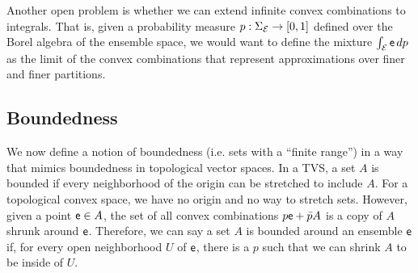 Another open problem is whether we can extend infinite convex combinations to integrals. That is, given a probability measure $p : \Sigma_{\mathcal{E}} \to [0,1]$ defined over the Borel algebra of the ensemble space, we would want to define the mixture $\int_{\mathcal{E}} \mathsf{e} \, dp$ as the limit of the convex combinations that represent approximations over finer and finer partitions. 

\subsection{Boundedness}

We now define a notion of boundedness (i.e. sets with a ``finite range'') in a way that mimics boundedness in topological vector spaces. In a TVS, a set $A$ is bounded if every neighborhood of the origin can be stretched to include $A$. For a topological convex space, we have no origin and no way to stretch sets. However, given a point $\mathsf{e} \in A$, the set of all convex combinations $p \mathsf{e} + \bar{p} A$ is a copy of $A$ shrunk around $\mathsf{e}$. Therefore, we can say a set $A$ is bounded around an ensemble $\mathsf{e}$ if, for every open neighborhood $U$ of $\mathsf{e}$, there is a $p$ such that we can shrink $A$ to be inside of $U$.

